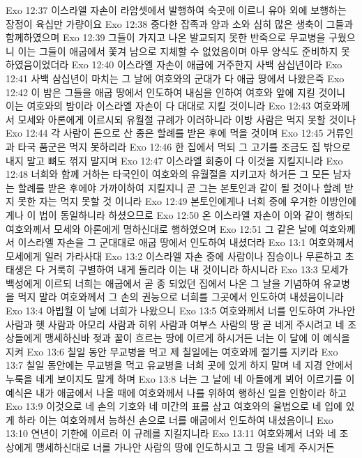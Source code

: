 Exo 12:37  이스라엘 자손이 라암셋에서 발행하여 숙곳에 이르니 유아 외에 보행하는 장정이 육십만 가량이요
Exo 12:38  중다한 잡족과 양과 소와 심히 많은 생축이 그들과 함께하였으며
Exo 12:39  그들이 가지고 나온 발교되지 못한 반죽으로 무교병을 구웠으니 이는 그들이 애굽에서 쫓겨 남으로 지체할 수 없었음이며 아무 양식도 준비하지 못하였음이었더라
Exo 12:40  이스라엘 자손이 애굽에 거주한지 사백 삼십년이라
Exo 12:41  사백 삼십년이 마치는 그 날에 여호와의 군대가 다 애굽 땅에서 나왔은즉
Exo 12:42  이 밤은 그들을 애굽 땅에서 인도하여 내심을 인하여 여호와 앞에 지킬 것이니 이는 여호와의 밤이라 이스라엘 자손이 다 대대로 지킬 것이니라
Exo 12:43  여호와께서 모세와 아론에게 이르시되 유월절 규례가 이러하니라 이방 사람은 먹지 못할 것이나
Exo 12:44  각 사람이 돈으로 산 종은 할례를 받은 후에 먹을 것이며
Exo 12:45  거류인과 타국 품군은 먹지 못하리라
Exo 12:46  한 집에서 먹되 그 고기를 조금도 집 밖으로 내지 말고 뼈도 꺾지 말지며
Exo 12:47  이스라엘 회중이 다 이것을 지킬지니라
Exo 12:48  너희와 함께 거하는 타국인이 여호와의 유월절을 지키고자 하거든 그 모든 남자는 할례를 받은 후에야 가까이하여 지킬지니 곧 그는 본토인과 같이 될 것이나 할례 받지 못한 자는 먹지 못할 것 이니라
Exo 12:49  본토인에게나 너희 중에 우거한 이방인에게나 이 법이 동일하니라 하셨으므로
Exo 12:50  온 이스라엘 자손이 이와 같이 행하되 여호와께서 모세와 아론에게 명하신대로 행하였으며
Exo 12:51  그 같은 날에 여호와께서 이스라엘 자손을 그 군대대로 애굽 땅에서 인도하여 내셨더라
Exo 13:1  여호와께서 모세에게 일러 가라사대
Exo 13:2  이스라엘 자손 중에 사람이나 짐승이나 무론하고 초태생은 다 거룩히 구별하여 내게 돌리라 이는 내 것이니라 하시니라
Exo 13:3  모세가 백성에게 이르되 너희는 애굽에서 곧 종 되었던 집에서 나온 그 날을 기념하여 유교병을 먹지 말라 여호와께서 그 손의 권능으로 너희를 그곳에서 인도하여 내셨음이니라
Exo 13:4  아빕월 이 날에 너희가 나왔으니
Exo 13:5  여호와께서 너를 인도하여 가나안 사람과 헷 사람과 아모리 사람과 히위 사람과 여부스 사람의 땅 곧 네게 주시려고 네 조상들에게 맹세하신바 젖과 꿀이 흐르는 땅에 이르게 하시거든 너는 이 달에 이 예식을 지켜
Exo 13:6  칠일 동안 무교병을 먹고 제 칠일에는 여호와께 절기를 지키라
Exo 13:7  칠일 동안에는 무교병을 먹고 유교병을 너희 곳에 있게 하지 말며 네 지경 안에서 누룩을 네게 보이지도 말게 하며
Exo 13:8  너는 그 날에 네 아들에게 뵈어 이르기를 이 예식은 내가 애굽에서 나올 때에 여호와께서 나를 위하여 행하신 일을 인함이라 하고
Exo 13:9  이것으로 네 손의 기호와 네 미간의 표를 삼고 여호와의 율법으로 네 입에 있게 하라 이는 여호와께서 능하신 손으로 너를 애굽에서 인도하여 내셨음이니
Exo 13:10  연년이 기한에 이르러 이 규례를 지킬지니라
Exo 13:11  여호와께서 너와 네 조상에게 맹세하신대로 너를 가나안 사람의 땅에 인도하시고 그 땅을 네게 주시거든
